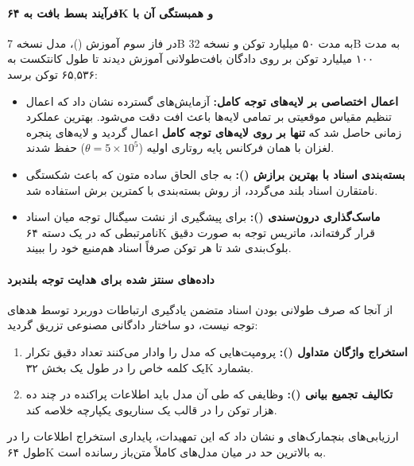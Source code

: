 \paragraph*{فرآیند بسط بافت به ۶۴K و همبستگی آن با }
در فاز سوم آموزش ()، مدل نسخه 7B به مدت ۵۰ میلیارد توکن و نسخه 32B به مدت ۱۰۰ میلیارد توکن بر روی دادگان بافت‌طولانی آموزش دیدند تا طول کانتکست به ۶۵,۵۳۶ توکن برسد:
\begin{itemize}
    \item \textbf{اعمال اختصاصی  بر لایه‌های توجه کامل:} آزمایش‌های گسترده نشان داد که اعمال تنظیم مقیاس موقعیتی  \cite{peng2023yarn} بر تمامی لایه‌ها باعث افت دقت می‌شود. بهترین عملکرد زمانی حاصل شد که  \textbf{تنها بر روی لایه‌های توجه کامل} اعمال گردید و لایه‌های پنجره لغزان با همان فرکانس پایه روتاری اولیه ($\theta = 5 \times 10^5$) حفظ شدند.
    \item \textbf{بسته‌بندی اسناد با بهترین برازش ():} به جای الحاق ساده متون که باعث شکستگی نامتقارن اسناد بلند می‌گردد، از روش بسته‌بندی با کمترین برش \cite{ding2024fewer} استفاده شد.
    \item \textbf{ماسک‌گذاری درون‌سندی ():} برای پیشگیری از نشت سیگنال توجه میان اسناد نامرتبطی که در یک دسته ۶۴K قرار گرفته‌اند، ماتریس توجه به صورت دقیق بلوک‌بندی شد تا هر توکن صرفاً اسناد هم‌منبع خود را ببیند.
\end{itemize}

\paragraph*{داده‌های سنتز شده برای هدایت توجه بلندبرد}
از آنجا که صرف طولانی بودن اسناد متضمن یادگیری ارتباطات دوربرد توسط هدهای توجه نیست، دو ساختار دادگانی مصنوعی تزریق گردید:
\begin{enumerate}
    \item \textbf{استخراج واژگان متداول ():} پرومپت‌هایی که مدل را وادار می‌کنند تعداد دقیق تکرار یک کلمه خاص را در طول یک بخش ۳۲K بشمارد.
    \item \textbf{تکالیف تجمیع بیانی ():} وظایفی که طی آن مدل باید اطلاعات پراکنده در چند ده هزار توکن را در قالب یک سناریوی یکپارچه خلاصه کند.
\end{enumerate}
ارزیابی‌های بنچمارک‌های  و  نشان داد که این تمهیدات، پایداری استخراج اطلاعات را در طول ۶۴K به بالاترین حد در میان مدل‌های کاملاً متن‌باز رسانده است.